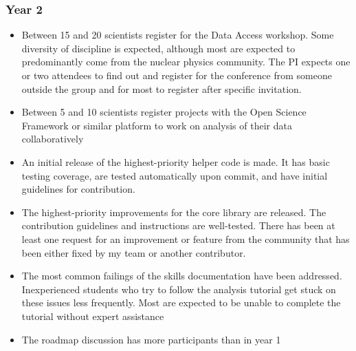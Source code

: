 \documentclass[11pt,oneside]{memoir}
\begin{document}
\subsubsection*{Year 2}
\begin{itemize}
  \item Between 15 and 20 scientists register for the Data Access workshop.  Some diversity of discipline is expected, although most are expected to predominantly come from the nuclear physics community.  The PI expects one or two attendees to find out and register for the conference from someone outside the group and for most to register after specific invitation.
  \item Between 5 and 10 scientists register projects with the Open Science Framework or similar platform to work on analysis of their data collaboratively
  \item An initial release of the highest-priority helper code is made.  It has basic testing coverage, are tested automatically upon commit, and have initial guidelines for contribution.
  \item The highest-priority improvements for the core library are released.  The contribution guidelines and instructions are well-tested.  There has been at least one request for an improvement or feature from the community that has been either fixed by my team or another contributor.
  \item The most common failings of the skills documentation have been addressed.  Inexperienced students who try to follow the analysis tutorial get stuck on these issues less frequently.  Most are expected to be unable to complete the tutorial without expert assistance
  \item The roadmap discussion has more participants than in year 1
\end{itemize}
\end{document}
